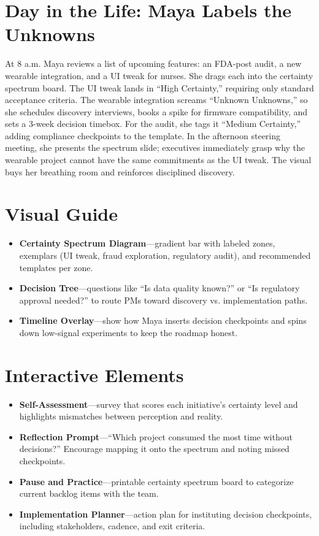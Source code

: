 \section{Day in the Life: Maya Labels the Unknowns}
At 8 a.m. Maya reviews a list of upcoming features: an FDA-post audit, a new wearable integration, and a UI tweak for nurses. She drags each into the certainty spectrum board. The UI tweak lands in ``High Certainty,'' requiring only standard acceptance criteria. The wearable integration screams ``Unknown Unknowns,'' so she schedules discovery interviews, books a spike for firmware compatibility, and sets a 3-week decision timebox. For the audit, she tags it ``Medium Certainty,'' adding compliance checkpoints to the template. In the afternoon steering meeting, she presents the spectrum slide; executives immediately grasp why the wearable project cannot have the same commitments as the UI tweak. The visual buys her breathing room and reinforces disciplined discovery.
\section{Visual Guide}
\label{sec:uncertainty-visuals}
\begin{itemize}
    \item \textbf{Certainty Spectrum Diagram}—gradient bar with labeled zones, exemplars (UI tweak, fraud exploration, regulatory audit), and recommended templates per zone.
    \item \textbf{Decision Tree}—questions like ``Is data quality known?'' or ``Is regulatory approval needed?'' to route PMs toward discovery vs. implementation paths.
    \item \textbf{Timeline Overlay}—show how Maya inserts decision checkpoints and spins down low-signal experiments to keep the roadmap honest.
\end{itemize}

\section{Interactive Elements}
\label{sec:uncertainty-interactive}
\begin{itemize}
    \item \textbf{Self-Assessment}—survey that scores each initiative’s certainty level and highlights mismatches between perception and reality.
    \item \textbf{Reflection Prompt}—``Which project consumed the most time without decisions?'' Encourage mapping it onto the spectrum and noting missed checkpoints.
    \item \textbf{Pause and Practice}—printable certainty spectrum board to categorize current backlog items with the team.
    \item \textbf{Implementation Planner}—action plan for instituting decision checkpoints, including stakeholders, cadence, and exit criteria.
\end{itemize}

